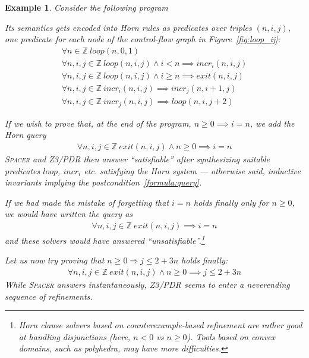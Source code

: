 \documentclass[a4paper]{article}
\newcommand{\ZZ}{\mathbb{Z}}
\newcommand{\soft}[1]{\textsc{#1}}
\theoremstyle{definition}
\theoremstyle{plain}
\newtheorem{example}{Example}
\begin{document}
\begin{example}\label{ex:loop_ij}
Consider the following program


Its semantics gets encoded into Horn \emph{rules} as predicates over triples $(n,i,j)$, one predicate for each node of the control-flow graph in Figure~\ref{fig:loop_ij}:
\begin{align}
\forall n \in \ZZ~ \mathit{loop}(n, 0, 1)\\
\forall n,i,j \in \ZZ~
  \mathit{loop}(n, i, j) \land i < n \implies
  \mathit{incr}_i(n, i, j)\\
\forall n,i,j \in \ZZ~
  \mathit{loop}(n, i, j) \land i \geq n \implies
  \mathit{exit}(n, i, j)\\
\forall n,i,j \in \ZZ~
  \mathit{incr}_i(n, i, j) \implies
  \mathit{incr}_j(n, i+1, j)\\
\forall n,i,j \in \ZZ~
  \mathit{incr}_j(n, i, j) \implies
  \mathit{loop}(n, i, j+2)
\end{align}

If we wish to prove that, at the end of the program, $n\geq 0 \implies i=n$, we add the Horn \emph{query}
\begin{align}
\forall n,i,j\in \ZZ~ \mathit{exit}(n,i,j) \land n\geq 0 \implies i=n
\label{formula:query}
\end{align}
\soft{Spacer} and \soft{Z3/PDR} then answer ``satisfiable'' after \emph{synthesizing} suitable predicates $\mathit{loop}$, $\mathit{incr}_i$ etc. satisfying the Horn system --- otherwise said, inductive invariants implying the postcondition~\ref{formula:query}.

If we had made the mistake of forgetting that $i=n$ holds finally only for $n \geq 0$, we would have written the query as
\begin{align}
\forall n,i,j\in \ZZ~ \mathit{exit}(n,i,j) \implies i=n
\end{align}
and these solvers would have answered ``unsatisfiable''.\footnote{Horn clause solvers based on counterexample-based refinement are rather good at handling disjunctions (here, $n < 0$ vs $n \geq 0$). Tools based on convex domains, such as polyhedra, may have more difficulties.}

Let us now try proving that $n \geq 0 \Rightarrow j \leq 2+3n$ holds finally:
\begin{align}
\forall n,i,j\in \ZZ~ \mathit{exit}(n,i,j) \land n\geq 0 \implies j \leq 2+3n
\end{align}
While \soft{Spacer} answers instantaneously, \soft{Z3/PDR} seems to enter a neverending sequence of refinements.
\end{example}
\end{document}
